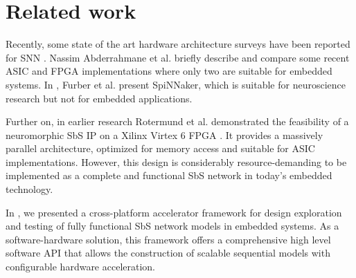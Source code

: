 \section{Related work}
\label{sec:related_work}

Recently, some state of the art hardware architecture surveys have been reported for SNN \cite{Design_Exploration_SbS_Trans20, SNN_Survey_Trans19, zhang2018survey}. Nassim Abderrahmane et al. briefly describe and compare some recent ASIC and FPGA implementations where only two are suitable for embedded systems. In \cite{Spinnaker_Trans13}, Furber et al. present SpiNNaker, which is suitable for neuroscience research but not for embedded applications.


Further on, in earlier research Rotermund et al. demonstrated the feasibility of a neuromorphic SbS IP on a Xilinx Virtex 6 FPGA \cite{rotermund2018massively}. It provides a massively parallel architecture, optimized for memory access and suitable for ASIC implementations. However, this design is considerably resource-demanding to be implemented as a complete and functional SbS network in today's embedded technology.

In \cite{nevarez2020accelerator}, we presented a cross-platform accelerator framework for design exploration and testing of fully functional SbS network models in embedded systems. As a software-hardware solution, this framework offers a comprehensive high level software API that allows the construction of scalable sequential models with configurable hardware acceleration.

